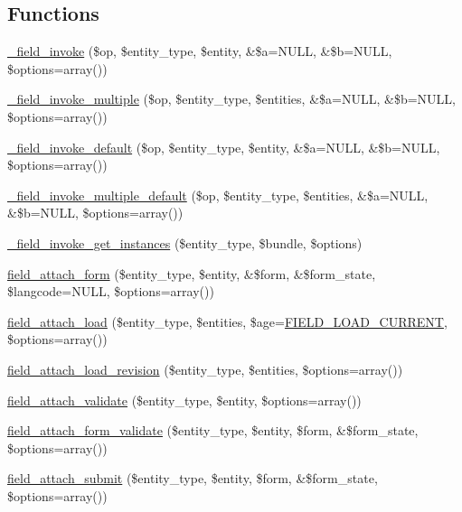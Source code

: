 \subsection*{Functions}
\begin{DoxyCompactItemize}
\item 
\hyperlink{group__field__attach_ga65f891a5eea6513f8505f5cfc5894896}{\_\-field\_\-invoke} (\$op, \$entity\_\-type, \$entity, \&\$a=NULL, \&\$b=NULL, \$options=array())
\item 
\hyperlink{group__field__attach_ga791aeba11e29038daf3e798dbea0df60}{\_\-field\_\-invoke\_\-multiple} (\$op, \$entity\_\-type, \$entities, \&\$a=NULL, \&\$b=NULL, \$options=array())
\item 
\hyperlink{group__field__attach_gaf000872e1850750f98445dfa96bfb602}{\_\-field\_\-invoke\_\-default} (\$op, \$entity\_\-type, \$entity, \&\$a=NULL, \&\$b=NULL, \$options=array())
\item 
\hyperlink{group__field__attach_gae25199cb48ebcbe016ed158985c755ef}{\_\-field\_\-invoke\_\-multiple\_\-default} (\$op, \$entity\_\-type, \$entities, \&\$a=NULL, \&\$b=NULL, \$options=array())
\item 
\hyperlink{group__field__attach_gac6a9d83062a9c3703f659bb2ccef3d76}{\_\-field\_\-invoke\_\-get\_\-instances} (\$entity\_\-type, \$bundle, \$options)
\item 
\hyperlink{group__field__attach_gac5bd0213dae78f7c1b3235f3acdde2c6}{field\_\-attach\_\-form} (\$entity\_\-type, \$entity, \&\$form, \&\$form\_\-state, \$langcode=NULL, \$options=array())
\item 
\hyperlink{group__field__attach_ga1e92543395961c912eb293b50e991586}{field\_\-attach\_\-load} (\$entity\_\-type, \$entities, \$age=\hyperlink{group__field_ga39b9fb0d47b181607a4d981a9bccbe8a}{FIELD\_\-LOAD\_\-CURRENT}, \$options=array())
\item 
\hyperlink{group__field__attach_gac79dd0f29910835c653b068233fa429b}{field\_\-attach\_\-load\_\-revision} (\$entity\_\-type, \$entities, \$options=array())
\item 
\hyperlink{group__field__attach_gae56981a9c1006e9c54f695f0ed515cd1}{field\_\-attach\_\-validate} (\$entity\_\-type, \$entity, \$options=array())
\item 
\hyperlink{group__field__attach_ga8c9a9775772774cefae4f6b9959d477e}{field\_\-attach\_\-form\_\-validate} (\$entity\_\-type, \$entity, \$form, \&\$form\_\-state, \$options=array())
\item 
\hyperlink{group__field__attach_ga756e59f651aa870ee79dd488b4e799c8}{field\_\-attach\_\-submit} (\$entity\_\-type, \$entity, \$form, \&\$form\_\-state, \$options=array())

\end{DoxyCompactItemize}

